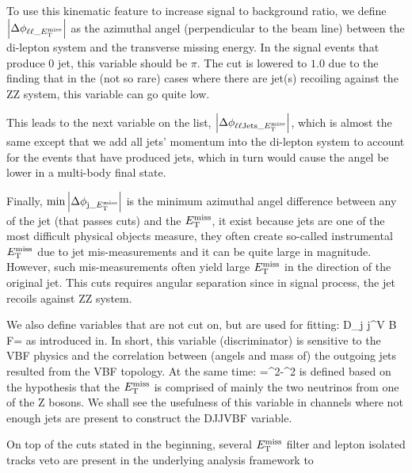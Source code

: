 To use this kinematic feature to increase signal to background ratio, we define 
$\abs{\Delta\phi_{\ell\ell\_E_{\mathrm{T}}^{\mathrm{miss}}}}$ as the azimuthal angel (perpendicular to 
the beam line) between the di-lepton system and the transverse missing energy. In the
signal events that produce 0 jet, this variable should be $\pi$. The cut is lowered to $1.0$ 
due to the finding that in the (not so rare) cases where there are jet(s) recoiling against
the ZZ system, this variable can go quite low.

This leads to the next variable on the list, $\abs{\Delta\phi_{\ell\ell\mathrm{Jets}\_E_{\mathrm{T}}^{\mathrm{miss}}}}$, which
is almost the same except that we add all jets' momentum into the di-lepton system to account
for the events that have produced jets, which in turn would cause the angel be lower in
a multi-body final state.

Finally, $\min{\abs{ \Delta\phi_{\mathrm{j}\_E_{\mathrm{T}}^{\mathrm{miss}}}}}$ is the minimum azimuthal angel difference between
any of the jet (that passes cuts) and the $E_{\mathrm{T}}^{\mathrm{miss}}$, it exist because jets are one of the 
most difficult physical objects measure, they often create so-called instrumental $E_{\mathrm{T}}^{\mathrm{miss}}$ due to jet
mis-measurements and it can be quite large in magnitude. However, such mis-measurements often yield large
$E_{\mathrm{T}}^{\mathrm{miss}}$ in the direction of the original jet. This cuts requires angular separation since in signal process,
the jet recoils against ZZ system.

We also define variables that are not cut on, but are used for fitting:
\be
D_{j j}^{V B F}=
\ee
as introduced in\cite{djjvbf}. In short, this variable (discriminator) is sensitive
to the VBF physics and the correlation between (angels and mass of) the outgoing jets resulted from the
VBF topology. At the same time:
\be
\mtzz={}^2-^{2}
\ee
is defined based on the hypothesis that the $E_{\mathrm{T}}^{\mathrm{miss}}$ is comprised of mainly the two neutrinos
from one of the Z bosons. We shall see the usefulness of this variable in channels where
not enough jets are present to construct the DJJVBF variable.

On top of the cuts stated in the beginning, several $E_{\mathrm{T}}^{\mathrm{miss}}$ filter and lepton isolated tracks veto
are present in the underlying analysis framework to 

